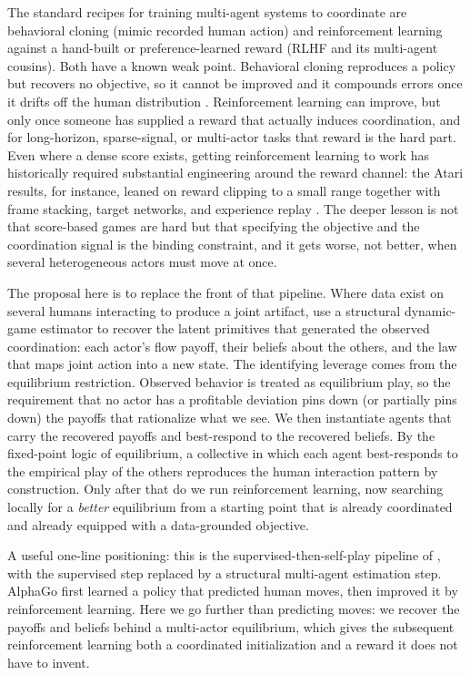 \documentclass[11pt]{article}
\theoremstyle{definition}
\begin{document}
The standard recipes for training multi-agent systems to coordinate are behavioral cloning (mimic recorded human action) and reinforcement learning against a hand-built or preference-learned reward (RLHF and its multi-agent cousins). Both have a known weak point. Behavioral cloning reproduces a policy but recovers no objective, so it cannot be improved and it compounds errors once it drifts off the human distribution \citep{rossGordonBagnell2011}. Reinforcement learning can improve, but only once someone has supplied a reward that actually induces coordination, and for long-horizon, sparse-signal, or multi-actor tasks that reward is the hard part. Even where a dense score exists, getting reinforcement learning to work has historically required substantial engineering around the reward channel: the Atari results, for instance, leaned on reward clipping to a small range together with frame stacking, target networks, and experience replay \citep{mnih2015}. The deeper lesson is not that score-based games are hard but that specifying the objective and the coordination signal is the binding constraint, and it gets worse, not better, when several heterogeneous actors must move at once.

The proposal here is to replace the front of that pipeline. Where data exist on several humans interacting to produce a joint artifact, use a structural dynamic-game estimator to recover the latent primitives that generated the observed coordination: each actor's flow payoff, their beliefs about the others, and the law that maps joint action into a new state. The identifying leverage comes from the equilibrium restriction. Observed behavior is treated as equilibrium play, so the requirement that no actor has a profitable deviation pins down (or partially pins down) the payoffs that rationalize what we see. We then instantiate agents that carry the recovered payoffs and best-respond to the recovered beliefs. By the fixed-point logic of equilibrium, a collective in which each agent best-responds to the empirical play of the others reproduces the human interaction pattern by construction. Only after that do we run reinforcement learning, now searching locally for a \emph{better} equilibrium from a starting point that is already coordinated and already equipped with a data-grounded objective.

A useful one-line positioning: this is the supervised-then-self-play pipeline of \citet{silver2016}, with the supervised step replaced by a structural multi-agent estimation step. AlphaGo first learned a policy that predicted human moves, then improved it by reinforcement learning. Here we go further than predicting moves: we recover the payoffs and beliefs behind a multi-actor equilibrium, which gives the subsequent reinforcement learning both a coordinated initialization and a reward it does not have to invent.
\end{document}
